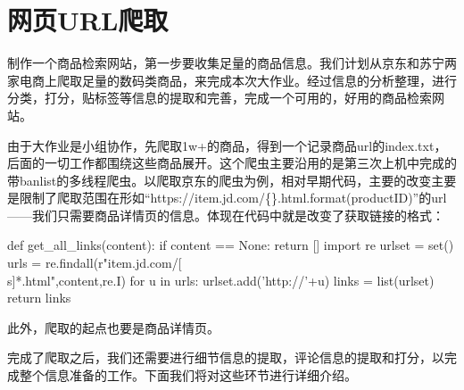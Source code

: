\section{网页URL爬取}

制作一个商品检索网站，第一步要收集足量的商品信息。我们计划从京东和苏宁两家电商上爬取足量的数码类商品，来完成本次大作业。经过信息的分析整理，进行分类，打分，贴标签等信息的提取和完善，完成一个可用的，好用的商品检索网站。

由于大作业是小组协作，先爬取1w+的商品，得到一个记录商品url的index.txt，后面的一切工作都围绕这些商品展开。这个爬虫主要沿用的是第三次上机中完成的带banlist的多线程爬虫。以爬取京东的爬虫为例，相对早期代码，主要的改变主要是限制了爬取范围在形如“https://item.jd.com/\{\}.html.format(productID)”的url——我们只需要商品详情页的信息。体现在代码中就是改变了获取链接的格式：

\begin{python}
def get_all_links(content):
    if content == None:
        return []
    import re
    urlset = set()
    urls = re.findall(r"item.jd.com/[\^\\s]*.html",content,re.I)
    for u in urls:
        urlset.add('http://'+u)
    links = list(urlset)
    return links

\end{python}

此外，爬取的起点也要是商品详情页。

完成了爬取之后，我们还需要进行细节信息的提取，评论信息的提取和打分，以完成整个信息准备的工作。下面我们将对这些环节进行详细介绍。


